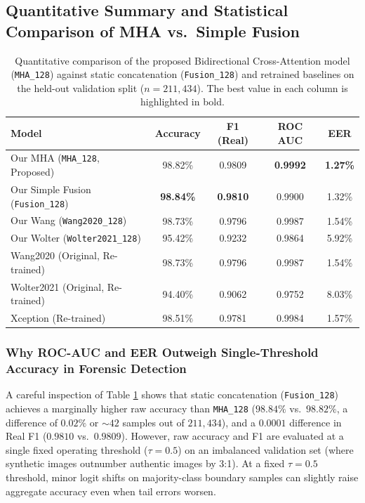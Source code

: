 \documentclass[fleqn,10pt]{wlscirep}
\begin{document}
\subsection*{Quantitative Summary and Statistical Comparison of MHA vs.\ Simple Fusion}
\begin{table}[htbp]
\centering
\caption{Quantitative comparison of the proposed Bidirectional Cross-Attention model (\texttt{MHA\_128}) against static concatenation (\texttt{Fusion\_128}) and retrained baselines on the held-out validation split ($n=211{,}434$). The best value in each column is highlighted in bold.}
\label{tab:model_comparison}
\begin{tabular}{|l|c|c|c|c|}
\hline
\textbf{Model} & \textbf{Accuracy} & \textbf{F1 (Real)} & \textbf{ROC AUC} & \textbf{EER} \\ \hline
Our MHA (\texttt{MHA\_128}, Proposed)     & 98.82\% & 0.9809 & \textbf{0.9992} & \textbf{1.27\%} \\ \hline
Our Simple Fusion (\texttt{Fusion\_128})  & \textbf{98.84\%} & \textbf{0.9810} & 0.9900 & 1.32\% \\ \hline
Our Wang (\texttt{Wang2020\_128})         & 98.73\% & 0.9796 & 0.9987 & 1.54\% \\ \hline
Our Wolter (\texttt{Wolter2021\_128})     & 95.42\% & 0.9232 & 0.9864 & 5.92\% \\ \hline
Wang2020 (Original, Re-trained)           & 98.73\% & 0.9796 & 0.9987 & 1.54\% \\ \hline
Wolter2021 (Original, Re-trained)         & 94.40\% & 0.9062 & 0.9752 & 8.03\% \\ \hline
Xception (Re-trained)                     & 98.51\% & 0.9781 & 0.9984 & 1.57\% \\ \hline
\end{tabular}
\end{table}

\subsubsection*{Why ROC-AUC and EER Outweigh Single-Threshold Accuracy in Forensic Detection}
A careful inspection of Table \ref{tab:model_comparison} shows that static concatenation (\texttt{Fusion\_128}) achieves a marginally higher raw accuracy than \texttt{MHA\_128} ($98.84\%$ vs.\ $98.82\%$, a difference of $0.02\%$ or $\sim 42$ samples out of $211{,}434$), and a $0.0001$ difference in Real F1 ($0.9810$ vs.\ $0.9809$). However, raw accuracy and F1 are evaluated at a single fixed operating threshold ($\tau = 0.5$) on an imbalanced validation set (where synthetic images outnumber authentic images by 3:1). At a fixed $\tau = 0.5$ threshold, minor logit shifts on majority-class boundary samples can slightly raise aggregate accuracy even when tail errors worsen.
\end{document}
